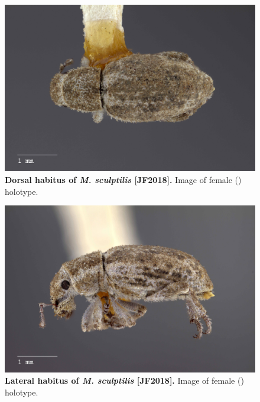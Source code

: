 \documentclass[fleqn,10pt,lineno]{wlpeerj} %
\begin{document}
\begin{figure}[h]
	\begin{sideways}
		\centering
		\includegraphics[height=\textwidth]{figure23.jpg}
	\end{sideways}
	\caption{\textbf{Dorsal habitus of \textit{M. sculptilis} [JF2018].} Image of female (\female) holotype.}
	\label{fig:sculptilis_F_dorsal}
\end{figure}

\begin{figure}[h]
	\begin{sideways}
		\centering
		\includegraphics[height=\textwidth]{figure24.jpg}
	\end{sideways}
	\caption{\textbf{Lateral habitus of \textit{M. sculptilis} [JF2018].} Image of female (\female) holotype.}
	\label{fig:sculptilis_F_lateral}
\end{figure}
\end{document}
